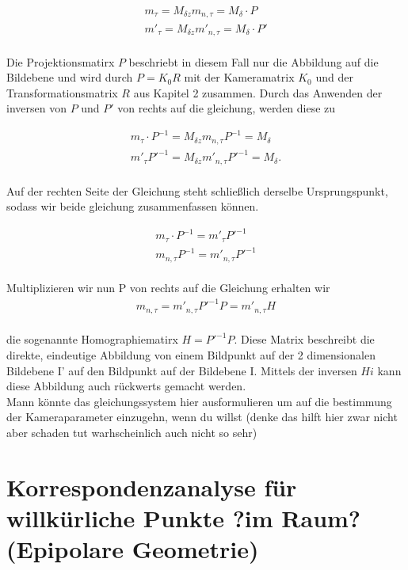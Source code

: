  
 \begin{gather}
 	m_{\tau}=M_{\delta z}m_{n,\tau} = M_{\delta} \cdot P \\
 	m'_{\tau}=M_{\delta z}m'_{n,\tau} = M_{\delta} \cdot P'
 \end{gather}\\
 
 Die Projektionsmatirx $P$ beschriebt in diesem Fall nur die Abbildung auf die Bildebene und wird durch $P=K_0R$ mit der Kameramatrix $K_0$ und der Transformationsmatrix $R$ aus Kapitel 2 zusammen. Durch das Anwenden der inversen von $P$ und $P'$ von rechts auf die gleichung, werden diese zu
 
 
 \begin{gather}
 	m_{\tau}\cdot P^{-1}=M_{\delta z}m_{n,\tau}P^{-1} = M_{\delta} \\
 	m'_{\tau}P'^{-1}=M_{\delta z}m'_{n,\tau}P'^{-1} = M_{\delta}.
 \end{gather}\\
 
 Auf der rechten Seite der Gleichung steht schließlich derselbe Ursprungspunkt, sodass wir beide gleichung zusammenfassen können. 
 
 \begin{gather}
 	m_{\tau}\cdot P^{-1} = m'_{\tau}P'^{-1} \\
 	m_{n,\tau}P^{-1}=m'_{n,\tau}P'^{-1}
 \end{gather}\\
 
 Multiplizieren wir nun P von rechts auf die Gleichung erhalten wir 
 \begin{gather}
 	m_{n,\tau}=m'_{n,\tau}P'^{-1}P=m'_{n,\tau}H
 \end{gather}\\
 
die sogenannte Homographiematirx $H=P'^{-1}P$. Diese Matrix beschreibt die direkte, eindeutige Abbildung von einem Bildpunkt auf der 2 dimensionalen Bildebene I' auf den Bildpunkt auf der Bildebene I. Mittels der inversen $Hi$ kann diese Abbildung auch rückwerts gemacht werden. 
 \\
 Mann könnte das gleichungssystem hier ausformulieren um auf die bestimmung der Kameraparameter einzugehn, wenn du willst (denke das hilft hier zwar nicht aber schaden tut warhscheinlich auch nicht so sehr)
 
 
 
 \section{Korrespondenzanalyse für willkürliche Punkte ?im Raum? (Epipolare Geometrie)}
 
